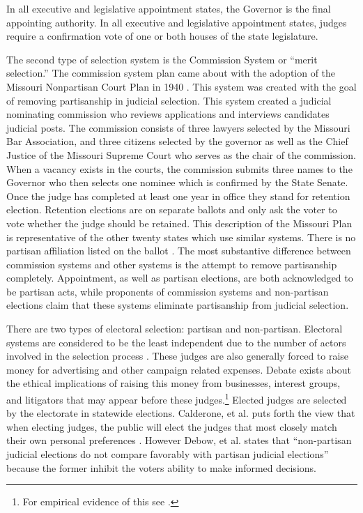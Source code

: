 \documentclass[12pt]{article}
\begin{document}
In all executive and legislative appointment states, the Governor is the final appointing authority.  In all executive and legislative appointment states, judges require a confirmation vote of one or both houses of the state legislature. 

The second type of selection system is the Commission System or “merit selection.” The commission system plan came about with the adoption of the Missouri Nonpartisan Court Plan in 1940 \citep{Watson1969}. This system was created with the goal of removing partisanship in judicial selection. This system created a judicial nominating commission who reviews applications and interviews candidates judicial posts. The commission consists of three lawyers selected by the Missouri Bar Association, and three citizens selected by the governor as well as the Chief Justice of the Missouri Supreme Court who serves as the chair of the commission. When a vacancy exists in the courts, the commission submits three names to the Governor who then selects one nominee which is confirmed by the State Senate. Once the judge has completed at least one year in office they stand for retention election. Retention elections are on separate ballots and only ask the voter to vote whether the judge should be retained. This description of the Missouri Plan is representative of the other twenty states which use similar systems.  There is no partisan affiliation listed on the ballot \citep{Watson1969}.  The most substantive difference between commission systems and other systems is the attempt to remove partisanship completely. Appointment, as well as partisan elections, are both acknowledged to be partisan acts, while proponents of commission systems and non-partisan elections claim that these systems eliminate partisanship from judicial selection. 

There are two types of electoral selection: partisan and non-partisan.  Electoral systems are considered to be the least independent due to the number of actors involved in the selection process \citep{Choi2010}. These judges are also generally forced to raise money for advertising and other campaign related expenses.  Debate exists about the ethical implications of raising this money from businesses, interest groups, and litigators that may appear before these judges.\footnote{For empirical evidence of this see \citep{Gibson2008}.}  Elected judges are selected by the electorate in statewide elections.  Calderone, et al. puts forth the view that when electing judges, the public will elect the judges that most closely match their own personal preferences \citep{Caldarone2009}.  However Debow, et al. \citeyearpar{Debow2013} states that ``non-partisan judicial elections do not compare favorably with partisan judicial elections'' because the former inhibit the voters ability to make informed decisions.
\end{document}
